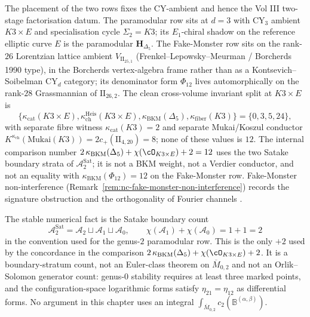 \begin{remark}[Landscape row split: $\Delta_5$ at $d = 3$, $\Phi_{12}$ on the Fake-Monster row]%
\label{rem:concordance-delta5-phi12-row-split}%
The placement of the two rows fixes the CY-ambient and hence the
Vol III two-stage factorisation datum. The paramodular row sits at
$d = 3$ with CY$_3$ ambient $K3 \times E$ and
specialisation cycle $\Sigma_2 = K3$; its $E_1$-chiral shadow on the
reference elliptic curve $E$ is the paramodular $\mathbf H_{\Delta_5}$.
The Fake-Monster row sits on the rank-$26$ Lorentzian lattice ambient
$V_{\mathrm{II}_{25,1}}$ (Frenkel--Lepowsky--Meurman / Borcherds 1990
type), in the Borcherds vertex-algebra frame rather than as a
Kontsevich--Soibelman CY$_d$ category; its denominator form $\Phi_{12}$
lives automorphically on the rank-$28$ Grassmannian of
$\mathrm{II}_{26,2}$. The clean cross-volume invariant split at
$K3 \times E$ is
\[
 \{\kappa_{\mathrm{cat}}(K3\times E),
 \kappa_{\mathrm{ch}}^{\mathrm{Heis}}(K3\times E),
 \kappa_{\mathrm{BKM}}(\Delta_5),
 \kappa_{\mathrm{fiber}}(K3)\}
 =\{0,3,5,24\},
\]
with separate fibre witness $\kappa_{\mathrm{cat}}(K3) = 2$ and
separate Mukai/Koszul conductor
$K^{\kappa_{\mathrm{ch}}}(\mathrm{Mukai}(K3)) = 2c_+(\mathrm{II}_{4,20}) = 8$;
none of these values is $12$. The internal comparison number
$2\,\kappa_{\mathrm{BKM}}(\Delta_5)+\chi(\cO_{K3\times E})+2=12$
uses the two Satake boundary strata of $\mathcal A_2^{\mathrm{Sat}}$;
it is not a BKM weight, not a Verdier conductor, and not an equality
with $\kappa_{\mathrm{BKM}}(\Phi_{12})=12$ on the Fake-Monster row.
Fake-Monster non-interference
(Remark~\ref{rem:nc-fake-monster-non-interference}) records the
signature obstruction and the orthogonality of Fourier channels
\cite{Bor95,GritsenkoNikulin1998}.
\end{remark}

\begin{remark}%
\label{thm:concordance-plus-two-euler-class}%
%
%
The stable numerical fact is the Satake boundary count
\[
 \mathcal A_2^{\mathrm{Sat}}
 =\mathcal A_2\sqcup\mathcal A_1\sqcup\mathcal A_0,\qquad
 \chi(\mathcal A_1)+\chi(\mathcal A_0)=1+1=2
\]
in the convention used for the genus-$2$ paramodular row. This is the
only $+2$ used by the concordance in the comparison
$2\,\kappa_{\mathrm{BKM}}(\Delta_5)+\chi(\cO_{K3\times E})+2$.
It is a boundary-stratum count, not an Euler-class theorem on
$\overline M_{0,2}$ and not an Orlik--Solomon generator count:
genus-$0$ stability requires at least three marked points, and the
configuration-space logarithmic forms satisfy
$\eta_{21}=\eta_{12}$ as differential forms. No argument in this
chapter uses an integral
$\int_{\overline M_{0,2}}c_2(\mathbb B^{(\alpha,\beta)})$.
\end{remark}

